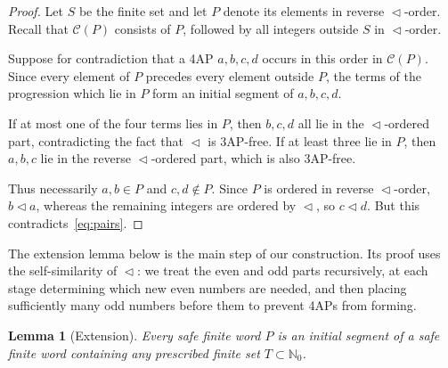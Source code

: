 \documentclass[12pt,reqno]{amsart}
\newtheorem{lemma}{Lemma}
\newcommand{\NN}{\mathbb N}
\newcommand{\bits}{\mathrel{\triangleleft}}
\newcommand{\C}[1]{\mathcal C(#1)}
\begin{document}
\begin{proof}
Let $S$ be the finite set and let $P$ denote its elements in reverse
$\bits$-order. Recall that $\C P$ consists of $P$, followed by all integers
outside $S$ in $\bits$-order.

Suppose for contradiction that a 4AP $a,b,c,d$ occurs in this order in $\C P$.
Since every element of $P$ precedes every element outside $P$, the terms of the
progression which lie in $P$ form an initial segment of $a,b,c,d$.

If at most one of the four terms lies in $P$, then $b,c,d$ all lie in the
$\bits$-ordered part, contradicting the fact that $\bits$ is 3AP-free. If at
least three lie in $P$, then $a,b,c$ lie in the reverse $\bits$-ordered part,
which is also 3AP-free.

Thus necessarily $a,b\in P$ and $c,d\notin P$. Since $P$ is ordered in reverse
$\bits$-order, $b\bits a$, whereas the remaining integers are ordered by
$\bits$, so $c\bits d$. But this contradicts~\eqref{eq:pairs}.
\end{proof}

The extension lemma below is the main step of our construction. Its proof uses
the self-similarity of $\bits$: we treat the even and odd parts recursively, at
each stage determining which new even numbers are needed, and then placing
sufficiently many odd numbers before them to prevent 4APs from forming.

\begin{lemma}[Extension]\label{lem:extend}
Every safe finite word $P$ is an initial segment of a safe finite word
containing any prescribed finite set $T\subset\NN_0$.
\end{lemma}
\end{document}
